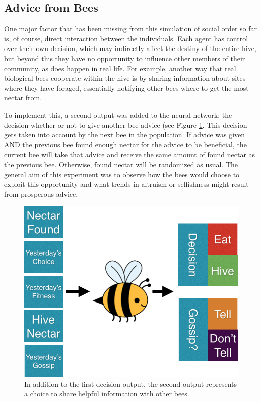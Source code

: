 \documentclass[11pt]{article}
\begin{document}

		\subsection{Advice from Bees} %
		\label{sub:advice_from_bees}

			One major factor that has been missing from this simulation of social order so far is, of course, direct interaction between the individuals. Each agent has control over their own decision, which may indirectly affect the destiny of the entire hive, but beyond this they have no opportunity to influence other members of their community, as does happen in real life. For example, another way that real biological bees cooperate within the hive is by sharing information about sites where they have foraged, essentially notifying other bees where to get the most nectar from. 

			To implement this, a second output was added to the neural network: the decision whether or not to give another bee advice (see Figure \ref{fig:gossip_system}. This decision gets taken into account by the next bee in the population. If advice was given AND the previous bee found enough nectar for the advice to be beneficial, the current bee will take that advice and receive the same amount of found nectar as the previous bee. Otherwise, found nectar will be randomized as usual. The general aim of this experiment was to observe how the bees would choose to exploit this opportunity and what trends in altruism or selfishness might result from prosperous advice.


			\begin{figure}[tb]
				\begin{center}
					\includegraphics[scale=.5]{bee_diagrams/gossip_system.png}
				\end{center}
				\caption{In addition to the first decision output, the second output represents a choice to share helpful information with other bees.}
				\label{fig:gossip_system}
			\end{figure}
\end{document}
